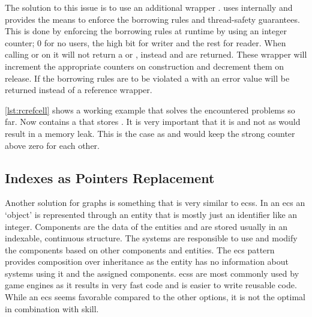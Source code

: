 \documentclass[thesis]{subfiles}
\begin{document}
    The solution to this issue is to use an additional wrapper \RcRefCellT.
    \RefCellT uses internally  and provides the means to enforce the borrowing rules and thread-safety guarantees.
    This is done by enforcing the borrowing rules at runtime by using an integer counter; 0 for no users, the high bit for writer and the rest for reader.
    When calling  or  on \RefCellT it will not return a  or , instead  and  are returned.
    These wrapper will increment the appropriate counters on construction and decrement them on release.
    If the borrowing rules are to be violated a  with an error value will be returned instead of a reference wrapper.\autocite{rust-doc}

    

    \autoref{lst:rcrefcell} shows a working example that solves the encountered problems so far.
    Now \Node contains a  that stores \WeakT.
    It is very important that it is \WeakT and not \RcT as \RcT would result in a memory leak.
    This is the case as  and  would keep the strong counter above zero for each other.


  \subsection{Indexes as Pointers Replacement}
    Another solution for graphs is something that is very similar to \glspl{ecs}.
    In an \gls{ecs} an `object' is represented through an entity that is mostly just an identifier like an integer.
    Components are the data of the entities and are stored usually in an indexable, continuous structure.
    The systems are responsible to use and modify the components based on other components and entities.\autocite{sfml}
    The \gls{ecs} pattern provides composition over inheritance as the entity has no information about systems using it and the assigned components.
    \glspl{ecs} are most commonly used by game engines as it results in very fast code and is easier to write reusable code\autocite{unity}.
    While an \gls{ecs} seems favorable compared to the other options, it is not the optimal in combination with \gls{skill}.
\end{document}
